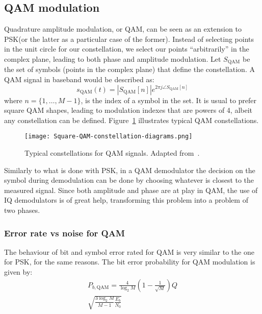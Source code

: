 \subsection{QAM modulation}

Quadrature amplitude modulation, or QAM, can be seen as an extension to PSK\@ (or
the latter as a particular case of the former). Instead of selecting points in the
unit circle for our constellation, we select our points ``arbitrarily'' in the
complex plane, leading to both phase and amplitude modulation. Let
\(S_{\text{QAM}}\) be the set of symbols (points in the complex plane) that define
the constellation. A QAM signal in baseband would be described as:
\begin{equation}
    s_{\text{QAM}}(t) = \left|S_{\text{QAM}}[n] \right| e^{2\pi j
            \angle S_{\text{QAM}}[n]}
\end{equation}
where \(n = \{1,\ldots,M-1\}\), is the index of a symbol in the set. It is usual
to prefer square QAM shapes, leading to modulation indexes that are powers of 4,
albeit any constellation can be defined. Figure~\ref{fig:qamconst} illustrates
typical QAM constellations.
\begin{figure}
    \centering
    \texttt{[image: Square-QAM-constellation-diagrams.png]}
    \caption{Typical constellations for QAM signals. Adapted from~\cite{Pfau2009}\label{fig:qamconst}.}
\end{figure}

Similarly to what is done with PSK, in a QAM demodulator the decision on the
symbol during demodulation can be done by choosing whatever is closest to the
measured signal. Since both amplitude and phase are at play in QAM, the use of IQ
demodulators is of great help, transforming this problem into a problem of two
phases.

\subsubsection{Error rate vs noise for QAM}

The behaviour of bit and symbol error rated for QAM is very similar to the one for
PSK, for the same reasons. The bit error probability for QAM modulation is given
by:
\begin{multline}
    P_{b, \text{QAM}} = \frac{4}{\log_2 M}
    \left( 1 - \frac{1}{\sqrt{M}}  \right) Q
    \\
    \sqrt{\frac{3 \log_2 M}{M-1} \frac{E_b}{N_0}}
\end{multline}

